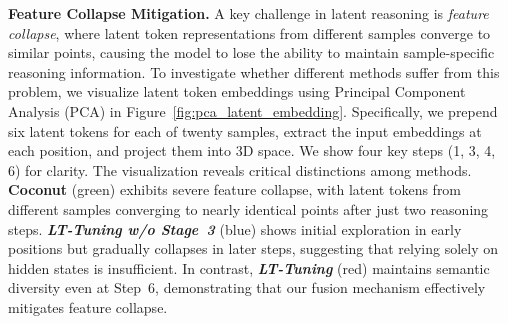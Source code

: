 \documentclass{article}
\theoremstyle{plain}
\theoremstyle{definition}
\theoremstyle{remark}
\begin{document}


\textbf{Feature Collapse Mitigation.} A key challenge in latent reasoning is \emph{feature collapse}, where latent token representations from different samples converge to similar points, causing the model to lose the ability to maintain sample-specific reasoning information. To investigate whether different methods suffer from this problem, we visualize latent token embeddings using Principal Component Analysis (PCA) in Figure~\ref{fig:pca_latent_embedding}. Specifically, we prepend six latent tokens for each of twenty samples, extract the input embeddings at each position, and project them into 3D space. We show four key steps (1, 3, 4, 6) for clarity.
The visualization reveals critical distinctions among methods. \textbf{Coconut} (green) exhibits severe feature collapse, with latent tokens from different samples converging to nearly identical points after just two reasoning steps. \textbf{\textit{LT-Tuning w/o Stage~3}} (blue) shows initial exploration in early positions but gradually collapses in later steps, suggesting that relying solely on hidden states is insufficient. In contrast, \textbf{\textit{LT-Tuning}} (red) maintains semantic diversity even at Step~6, demonstrating that our fusion mechanism effectively mitigates feature collapse.

\end{document}
